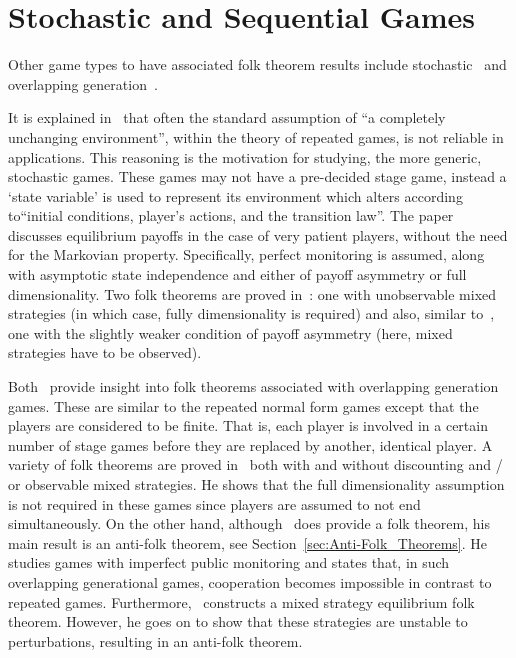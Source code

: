\section{Stochastic and Sequential Games}\label{sec:Stochastic_and_Sequential_Games}
Other game types to have associated folk theorem results include
stochastic~\cite{Dutta1995} and overlapping generation~\cite{Bhaskar1998,
Gossner1996}.

It is explained in~\cite{Dutta1995} that often the standard assumption of ``a
completely unchanging environment'', within the theory of repeated games, is not
reliable in applications. This reasoning is the motivation for studying, the
more generic, stochastic games. These games may not have a pre-decided stage
game, instead a `state variable' is used to represent its environment which
alters according to``initial conditions, player's actions, and the transition
law''. The paper~\cite{Dutta1995} discusses equilibrium payoffs in the case of
very patient players, without the
need for the Markovian property. Specifically, perfect monitoring is assumed,
along with asymptotic state independence and either of payoff asymmetry or full
dimensionality. Two folk theorems are proved in~\cite{Dutta1995}: one with
unobservable mixed strategies (in which case, fully dimensionality is required)
and also, similar to~\cite{Abreu1994}, one with the slightly weaker condition of
payoff asymmetry (here, mixed strategies have to be observed).

Both~\cite{Bhaskar1998, Gossner1996} provide insight into folk theorems
associated with overlapping generation games. These are similar to the repeated
normal form games except that the players are considered to be finite.
That is, each player is involved in a certain number of stage games before they
are replaced by another, identical player. A variety
of folk theorems are proved in~\cite{Gossner1996} both with and without
discounting and / or observable mixed strategies. He shows that the full
dimensionality assumption is not required in
these games since players are assumed to not end simultaneously. On the other
hand, although~\cite{Bhaskar1998} does provide a folk theorem, his main result
is an anti-folk theorem, see Section~\ref{sec:Anti-Folk_Theorems}. He studies games
with imperfect public monitoring and states that, in such overlapping
generational games, cooperation becomes impossible in contrast to repeated
games. Furthermore,~\cite{Bhaskar1998} constructs a mixed strategy equilibrium
folk theorem. However, he goes on to show that these strategies are unstable to
perturbations, resulting in an anti-folk theorem.

